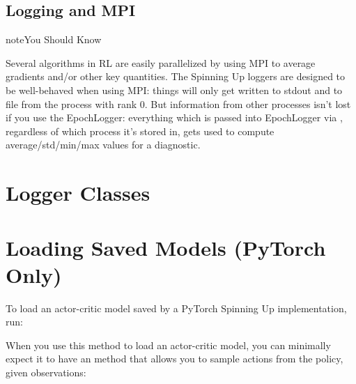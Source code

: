 \documentclass[letterpaper,10pt,english]{sphinxmanual}
\begin{document}
\subsection{Logging and MPI}
\label{\detokenize{utils/logger:logging-and-mpi}}
\begin{sphinxadmonition}{note}{You Should Know}

Several algorithms in RL are easily parallelized by using MPI to average gradients and/or other key quantities. The Spinning Up loggers are designed to be well-behaved when using MPI: things will only get written to stdout and to file from the process with rank 0. But information from other processes isn’t lost if you use the EpochLogger: everything which is passed into EpochLogger via , regardless of which process it’s stored in, gets used to compute average/std/min/max values for a diagnostic.
\end{sphinxadmonition}


\section{Logger Classes}
\label{\detokenize{utils/logger:logger-classes}}

\section{Loading Saved Models (PyTorch Only)}
\label{\detokenize{utils/logger:loading-saved-models-pytorch-only}}
To load an actor-critic model saved by a PyTorch Spinning Up implementation, run:

\begin{sphinxVerbatim}[commandchars=\\\{\}]
  
\end{sphinxVerbatim}

When you use this method to load an actor-critic model, you can minimally expect it to have an  method that allows you to sample actions from the policy, given observations:

\begin{sphinxVerbatim}[commandchars=\\\{\}]
   
\end{sphinxVerbatim}
\end{document}
